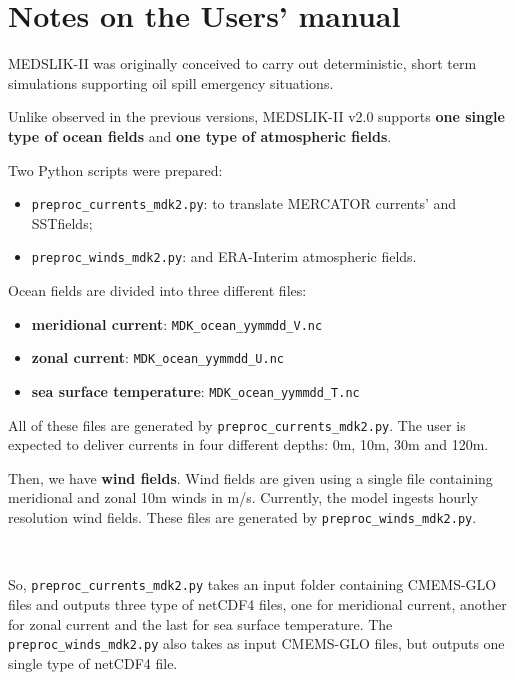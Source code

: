 \section{Notes on the Users' manual}

MEDSLIK-II was originally conceived to carry out deterministic, short term simulations supporting oil spill emergency situations.

Unlike observed in the previous versions, MEDSLIK-II v2.0 supports \textbf{one single type of ocean fields} and \textbf{one type of atmospheric fields}.

Two Python scripts were prepared:

\begin{itemize}
    \item \texttt{preproc\_currents\_mdk2.py}: to translate MERCATOR currents' and SSTfields;
    \item \texttt{preproc\_winds\_mdk2.py}: and ERA-Interim atmospheric fields.
\end{itemize}  

Ocean fields are divided into three different files:

\begin{itemize}
    \item \textbf{meridional current}: \texttt{MDK\_ocean\_yymmdd\_V.nc}
    \item \textbf{zonal current}: \texttt{MDK\_ocean\_yymmdd\_U.nc}
    \item \textbf{sea surface temperature}: \texttt{MDK\_ocean\_yymmdd\_T.nc}
\end{itemize}

All of these files are generated by \texttt{preproc\_currents\_mdk2.py}. The user is expected to deliver currents in four different depths: 0m, 10m, 30m and 120m. 

Then, we have \textbf{wind fields}. Wind fields are given using a single file containing meridional and zonal 10m winds in m/s. Currently, the model ingests hourly resolution wind fields. These files are generated by \texttt{preproc\_winds\_mdk2.py}.


\

So, \texttt{preproc\_currents\_mdk2.py} takes an input folder containing CMEMS-GLO files and outputs three type of netCDF4 files, one for meridional current, another for zonal current and the last for sea surface temperature. The \texttt{preproc\_winds\_mdk2.py} also takes as input CMEMS-GLO files, but outputs one single type of netCDF4 file.
